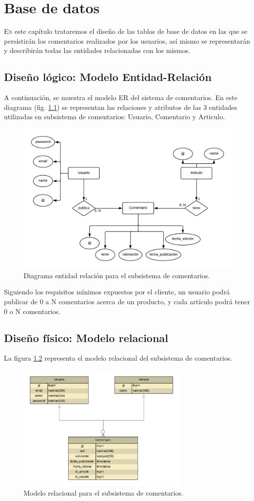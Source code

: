 \chapter{Base de datos}
\lettrine{E}{n} este capítulo trataremos el diseño de las tablas de base de datos en las que se persistirán los comentarios realizados por los usuarios, así mismo se representarán y describirán todas las entidades relacionadas con los mismos.

\section{Diseño lógico: Modelo Entidad-Relación}
A continuación, se muestra el modelo ER del sistema de comentarios. En este diagrama (fig. \ref{erDiag}) se representan las relaciones y atributos de las 3 entidades utilizadas en subsistema de comentarios: Usuario, Comentario y Articulo.

\begin{figure}[ht!]
	\centering
	\includegraphics[width=1\textwidth]{imaxes/er.png}
	\caption{Diagrama entidad relación para el subsistema de comentarios.}
	\label{erDiag}
\end{figure}

Siguiendo los requisitos mínimos expuestos por el cliente, un usuario podrá publicar de 0 a N comentarios acerca de un producto, y cada artículo podrá tener 0 o N comentarios.

\section{Diseño físico: Modelo relacional}

La figura \ref{erModel} representa el modelo relacional del subsistema de comentarios.

\begin{figure}[ht!]
	\centering
	\includegraphics[width=0.75\textwidth]{imaxes/ermodel.png}
	\caption{Modelo relacional para el subsistema de comentarios.}
	\label{erModel}
\end{figure}